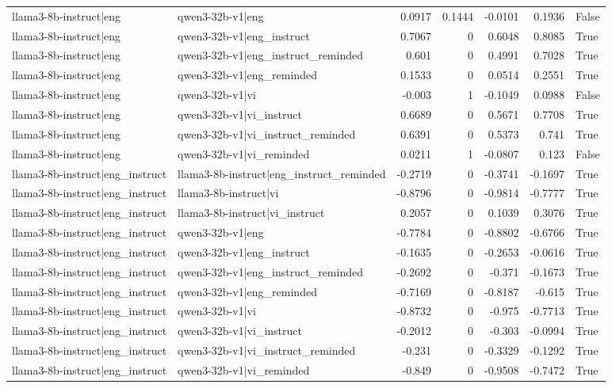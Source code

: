 \begin{table}
\begin{tabular}{l l r r r r l}
llama3-8b-instruct|eng & qwen3-32b-v1|eng & 0.0917 & 0.1444 & -0.0101 & 0.1936 & False \\
llama3-8b-instruct|eng & qwen3-32b-v1|eng_instruct & 0.7067 & 0 & 0.6048 & 0.8085 & True \\
llama3-8b-instruct|eng & qwen3-32b-v1|eng_instruct_reminded & 0.601 & 0 & 0.4991 & 0.7028 & True \\
llama3-8b-instruct|eng & qwen3-32b-v1|eng_reminded & 0.1533 & 0 & 0.0514 & 0.2551 & True \\
llama3-8b-instruct|eng & qwen3-32b-v1|vi & -0.003 & 1 & -0.1049 & 0.0988 & False \\
llama3-8b-instruct|eng & qwen3-32b-v1|vi_instruct & 0.6689 & 0 & 0.5671 & 0.7708 & True \\
llama3-8b-instruct|eng & qwen3-32b-v1|vi_instruct_reminded & 0.6391 & 0 & 0.5373 & 0.741 & True \\
llama3-8b-instruct|eng & qwen3-32b-v1|vi_reminded & 0.0211 & 1 & -0.0807 & 0.123 & False \\
llama3-8b-instruct|eng_instruct & llama3-8b-instruct|eng_instruct_reminded & -0.2719 & 0 & -0.3741 & -0.1697 & True \\
llama3-8b-instruct|eng_instruct & llama3-8b-instruct|vi & -0.8796 & 0 & -0.9814 & -0.7777 & True \\
llama3-8b-instruct|eng_instruct & llama3-8b-instruct|vi_instruct & 0.2057 & 0 & 0.1039 & 0.3076 & True \\
llama3-8b-instruct|eng_instruct & qwen3-32b-v1|eng & -0.7784 & 0 & -0.8802 & -0.6766 & True \\
llama3-8b-instruct|eng_instruct & qwen3-32b-v1|eng_instruct & -0.1635 & 0 & -0.2653 & -0.0616 & True \\
llama3-8b-instruct|eng_instruct & qwen3-32b-v1|eng_instruct_reminded & -0.2692 & 0 & -0.371 & -0.1673 & True \\
llama3-8b-instruct|eng_instruct & qwen3-32b-v1|eng_reminded & -0.7169 & 0 & -0.8187 & -0.615 & True \\
llama3-8b-instruct|eng_instruct & qwen3-32b-v1|vi & -0.8732 & 0 & -0.975 & -0.7713 & True \\
llama3-8b-instruct|eng_instruct & qwen3-32b-v1|vi_instruct & -0.2012 & 0 & -0.303 & -0.0994 & True \\
llama3-8b-instruct|eng_instruct & qwen3-32b-v1|vi_instruct_reminded & -0.231 & 0 & -0.3329 & -0.1292 & True \\
llama3-8b-instruct|eng_instruct & qwen3-32b-v1|vi_reminded & -0.849 & 0 & -0.9508 & -0.7472 & True \\

\end{tabular}
\end{table}
